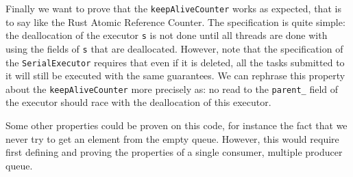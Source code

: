 Finally we want to prove that the \texttt{keepAliveCounter} works as expected, that is to say like the Rust Atomic Reference Counter. The specification is quite simple: the deallocation of the executor \texttt{s} is not done until all threads are done with using the fields of \texttt{s} that are deallocated. However, note that the specification of the \texttt{SerialExecutor} requires that even if it is deleted, all the tasks submitted to it will still be executed with the same guarantees. %
We can rephrase this property about the \texttt{keepAliveCounter} more precisely as: no read to the \texttt{parent\_} field of the executor should race with the deallocation of this executor.

Some other properties could be proven on this code, for instance the fact that we never try to get an element from the empty queue. However, this would require first defining and proving the properties of a single consumer, multiple producer queue.

